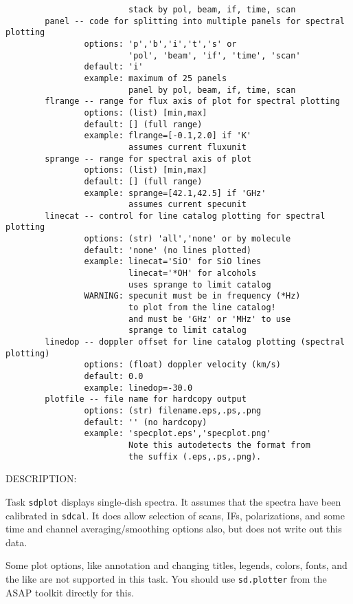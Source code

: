 \begin{verbatim}
                         stack by pol, beam, if, time, scan
        panel -- code for splitting into multiple panels for spectral plotting
                options: 'p','b','i','t','s' or
                         'pol', 'beam', 'if', 'time', 'scan'
                default: 'i'
                example: maximum of 25 panels
                         panel by pol, beam, if, time, scan
        flrange -- range for flux axis of plot for spectral plotting
                options: (list) [min,max]
                default: [] (full range)
                example: flrange=[-0.1,2.0] if 'K'
                         assumes current fluxunit
        sprange -- range for spectral axis of plot
                options: (list) [min,max]
                default: [] (full range)
                example: sprange=[42.1,42.5] if 'GHz'
                         assumes current specunit
        linecat -- control for line catalog plotting for spectral plotting
                options: (str) 'all','none' or by molecule
                default: 'none' (no lines plotted)
                example: linecat='SiO' for SiO lines
                         linecat='*OH' for alcohols
                         uses sprange to limit catalog
                WARNING: specunit must be in frequency (*Hz)
                         to plot from the line catalog!
                         and must be 'GHz' or 'MHz' to use
                         sprange to limit catalog
        linedop -- doppler offset for line catalog plotting (spectral plotting)
                options: (float) doppler velocity (km/s)
                default: 0.0
                example: linedop=-30.0
        plotfile -- file name for hardcopy output
                options: (str) filename.eps,.ps,.png
                default: '' (no hardcopy)
                example: 'specplot.eps','specplot.png'
                         Note this autodetects the format from
                         the suffix (.eps,.ps,.png).

\end{verbatim}
    DESCRIPTION:
    
    Task {\tt sdplot} displays single-dish spectra.  
    It assumes that the spectra have been calibrated in {\tt sdcal}.
    It does allow selection of scans, IFs, polarizations, and
    some time and channel averaging/smoothing options also,
    but does not write out this data.
    
    Some plot options, like annotation and changing titles,
    legends, colors, fonts, and the like are not supported
    in this task.  You should use {\tt sd.plotter} from the ASAP
    toolkit directly for this.
    
